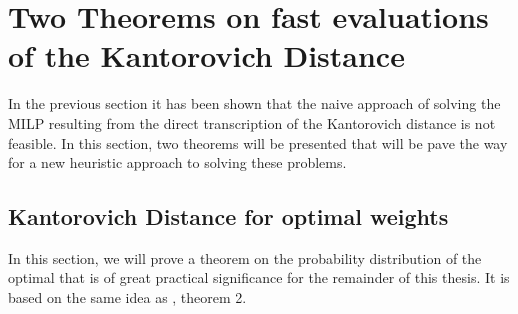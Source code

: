 \section{Two Theorems on fast evaluations of the Kantorovich Distance}
\label{sec:two-theorems}
In the previous section it has been shown that the naive approach of solving the MILP resulting from the direct transcription of the Kantorovich distance is not feasible.
In this section, two theorems will be presented that will be pave the way for a new heuristic approach to solving these problems.
\subsection{Kantorovich Distance for optimal weights}
\label{sec:optimal-weights-proof}
In this section, we will prove a theorem on the probability distribution of the optimal
that is of great practical significance for the remainder of this thesis.
It is based on the same idea as \cite{Dupacova2003}, theorem 2.

